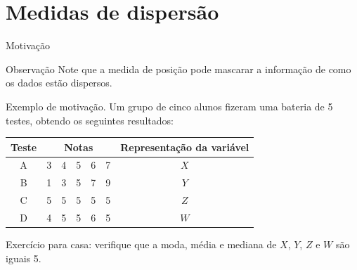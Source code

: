 \documentclass[8pt]{beamer}
\begin{document}
\section{Medidas de dispersão}

\begin{frame}{Motivação}
 \begin{block}{Observação}
  Note que a medida de posição pode mascarar a informação de como os dados estão dispersos.
 \end{block}
 
 \begin{block}{Exemplo de motivação.}
  Um grupo de cinco alunos fizeram uma bateria de 5 testes, obtendo os seguintes resultados:
  \begin{table}
   \centering
   \begin{tabular}{c|ccccc|c}
   \toprule[0.05cm]
    Teste & \multicolumn{5}{|c|}{Notas} & Representação da variável \\ \midrule[0.05cm]
    A & 3 & 4 & 5 & 6 & 7 & $X$ \\
    B & 1 & 3 & 5 & 7 & 9 & $Y$ \\
    C & 5 & 5 & 5 & 5 & 5 & $Z$ \\
    D & 4 & 5 & 5 & 6 & 5 & $W$\\ \bottomrule[0.05cm]
   \end{tabular}
  \end{table}
  {\color{magenta} Exercício para casa:} verifique que a moda, média e mediana de $X$, $Y$, $Z$ e $W$ são iguais 5.
 \end{block}
\end{frame}
\end{document}

